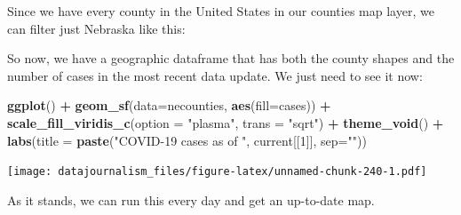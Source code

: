 \documentclass[]{book}
\newenvironment{Shaded}{\begin{snugshade}}{\end{snugshade}}
\newcommand{\DataTypeTok}[1]{\textcolor[rgb]{0.13,0.29,0.53}{#1}}
\newcommand{\DecValTok}[1]{\textcolor[rgb]{0.00,0.00,0.81}{#1}}
\newcommand{\KeywordTok}[1]{\textcolor[rgb]{0.13,0.29,0.53}{\textbf{#1}}}
\newcommand{\NormalTok}[1]{#1}
\newcommand{\OperatorTok}[1]{\textcolor[rgb]{0.81,0.36,0.00}{\textbf{#1}}}
\newcommand{\StringTok}[1]{\textcolor[rgb]{0.31,0.60,0.02}{#1}}
\begin{document}
Since we have every county in the United States in our counties map layer, we can filter just Nebraska like this:

\begin{Shaded}
\end{Shaded}

So now, we have a geographic dataframe that has both the county shapes and the number of cases in the most recent data update. We just need to see it now:

\begin{Shaded}
\begin{Highlighting}[]
\KeywordTok{ggplot}\NormalTok{() }\OperatorTok{+}\StringTok{ }
\StringTok{  }\KeywordTok{geom_sf}\NormalTok{(}\DataTypeTok{data=}\NormalTok{necounties, }\KeywordTok{aes}\NormalTok{(}\DataTypeTok{fill=}\NormalTok{cases)) }\OperatorTok{+}\StringTok{ }
\StringTok{  }\KeywordTok{scale_fill_viridis_c}\NormalTok{(}\DataTypeTok{option =} \StringTok{"plasma"}\NormalTok{, }\DataTypeTok{trans =} \StringTok{"sqrt"}\NormalTok{) }\OperatorTok{+}\StringTok{ }
\StringTok{  }\KeywordTok{theme_void}\NormalTok{() }\OperatorTok{+}\StringTok{ }
\StringTok{  }\KeywordTok{labs}\NormalTok{(}\DataTypeTok{title =} \KeywordTok{paste}\NormalTok{(}\StringTok{"COVID-19 cases as of "}\NormalTok{, current[[}\DecValTok{1}\NormalTok{]], }\DataTypeTok{sep=}\StringTok{""}\NormalTok{))}
\end{Highlighting}
\end{Shaded}

\texttt{[image: datajournalism\_files/figure-latex/unnamed-chunk-240-1.pdf]}

As it stands, we can run this every day and get an up-to-date map.
\end{document}
